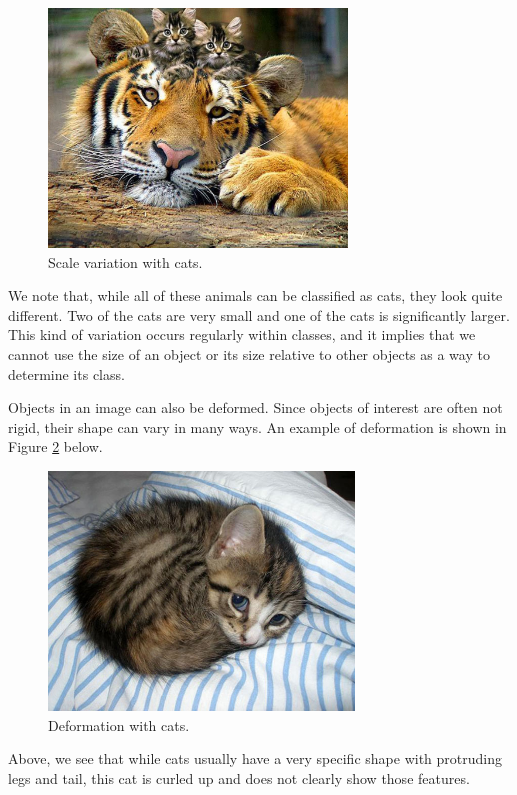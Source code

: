 \begin{figure}[ht!] \centering
\includegraphics[height=2.5in]{../figures/kitty_scale_variation.jpg}
\caption{Scale variation with cats.} \label{fig:scale_variation} \end{figure}

\noindent We note that, while all of these animals can be classified as cats,
they look quite different. Two of the cats are very small and one of the cats
is significantly larger. This kind of variation occurs regularly within
classes, and it implies that we cannot use the size of an object or its size
relative to other objects as a way to determine its class.

\noindent Objects in an image can also be deformed. Since objects of interest
are often not rigid, their shape can vary in many ways. An example of
deformation is shown in Figure \ref{fig:deformation} below.

\begin{figure}[ht!] \centering
\includegraphics[height=2.5in]{../figures/kitty_deformed.jpg}
\caption{Deformation with cats.} \label{fig:deformation} \end{figure}

\noindent Above, we see that while cats usually have a very specific shape with
protruding legs and tail, this cat is curled up and does not clearly show those
features.

